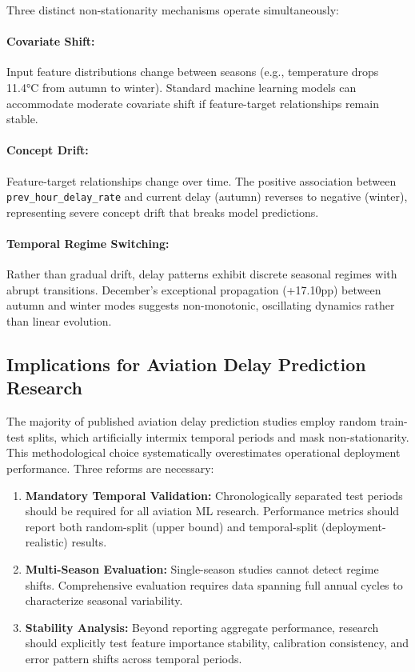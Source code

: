 \documentclass{report}
\begin{document}
Three distinct non-stationarity mechanisms operate simultaneously:

\paragraph{Covariate Shift:} Input feature distributions change between seasons (e.g., temperature drops 11.4°C from autumn to winter). Standard machine learning models can accommodate moderate covariate shift if feature-target relationships remain stable.

\paragraph{Concept Drift:} Feature-target relationships change over time. The positive association between \texttt{prev\_hour\_delay\_rate} and current delay (autumn) reverses to negative (winter), representing severe concept drift that breaks model predictions.

\paragraph{Temporal Regime Switching:} Rather than gradual drift, delay patterns exhibit discrete seasonal regimes with abrupt transitions. December's exceptional propagation (+17.10pp) between autumn and winter modes suggests non-monotonic, oscillating dynamics rather than linear evolution.

\subsection{Implications for Aviation Delay Prediction Research}

The majority of published aviation delay prediction studies employ random train-test splits, which artificially intermix temporal periods and mask non-stationarity. This methodological choice systematically overestimates operational deployment performance. Three reforms are necessary:

\begin{enumerate}
    \item \textbf{Mandatory Temporal Validation:} Chronologically separated test periods should be required for all aviation ML research. Performance metrics should report both random-split (upper bound) and temporal-split (deployment-realistic) results.
    
    \item \textbf{Multi-Season Evaluation:} Single-season studies cannot detect regime shifts. Comprehensive evaluation requires data spanning full annual cycles to characterize seasonal variability.
    
    \item \textbf{Stability Analysis:} Beyond reporting aggregate performance, research should explicitly test feature importance stability, calibration consistency, and error pattern shifts across temporal periods.
\end{enumerate}
\end{document}
